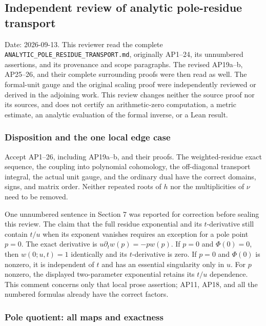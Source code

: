 \subsection{Independent review of analytic pole-residue transport}\label{endpoint-analytic_pole_review--independent-review-of-analytic-pole-residue-transport}

Date: 2026-09-13. This reviewer read the complete \nolinkurl{ANALYTIC_POLE_RESIDUE_TRANSPORT.md}, originally AP1--24, its unnumbered assertions, and its provenance and scope paragraphs. The revised AP19a--b, AP25--26, and their complete surrounding proofs were then read as well. The formal-unit gauge and the original scaling proof were independently reviewed or derived in the adjoining work. This review changes neither the source proof nor its sources, and does not certify an arithmetic-zero computation, a metric estimate, an analytic evaluation of the formal inverse, or a Lean result.

\subsubsection{Disposition and the one local edge case}\label{endpoint-analytic_pole_review--disposition-and-the-one-local-edge-case}

Accept AP1--26, including AP19a--b, and their proofs. The weighted-residue exact sequence, the coupling into polynomial cohomology, the off-diagonal transport integral, the actual unit gauge, and the ordinary dual have the correct domains, signs, and matrix order. Neither repeated roots of \(h\) nor the multiplicities of \(\nu\) need to be removed.

One unnumbered sentence in Section 7 was reported for correction before sealing this review. The claim that the full residue exponential and its \(t\)-derivative still contain \(t/u\) when its exponent vanishes requires an exception for a pole point \(p=0\). The exact derivative is \(u\partial_t w(p)=-p w(p)\). If \(p=0\) and \(\Phi(0)=0\), then \(w(0;u,t)=1\) identically and its \(t\)-derivative is zero. If \(p=0\) and \(\Phi(0)\) is nonzero, it is independent of \(t\) and has an essential singularity only in \(u\). For \(p\) nonzero, the displayed two-parameter exponential retains its \(t/u\) dependence. This comment concerns only that local prose assertion; AP11, AP18, and all the numbered formulas already have the correct factors.

\subsubsection{Pole quotient: all maps and exactness}\label{endpoint-analytic_pole_review--pole-quotient-all-maps-and-exactness}

